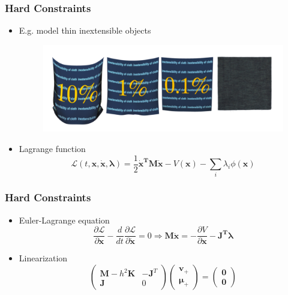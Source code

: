 \documentclass[serif,mathserif]{beamer}
\newcommand{\BOLD}[1]{\mathbf{#1}}
\newcommand{\PDIF}[2]{\frac{\partial #1}{\partial #2}}
\begin{document}
\begin{frame}
 \frametitle{Hard Constraints}
 \begin{itemize}
  \item E.g. model thin inextensible objects 
  \begin{figure}
    \centering 
    \includegraphics[scale=0.2]{img/inextensible.png}
  \end{figure}
  \item Lagrange function
    \begin{equation*}
      \mathcal{L}(t, \BOLD{x}, \BOLD{\dot x}, \BOLD{\lambda}) = \frac{1}{2}\BOLD{\dot x^T M \dot x} - V(\BOLD{x}) - \sum_i \lambda_i \phi(\BOLD{x})
    \end{equation*}
 \end{itemize}
\end{frame}

\begin{frame}
 \frametitle{Hard Constraints}
 \begin{itemize}
    \item Euler-Lagrange equation
    \begin{equation*}
      \PDIF{\mathcal{L}}{\BOLD{x}}-\frac{d}{dt}\PDIF{\mathcal{L}}{\BOLD{\dot x}} = 0
      \Longrightarrow \BOLD{M\ddot x} = -\PDIF{V}{\BOLD{x}}-\BOLD{J^T\lambda}
    \end{equation*}
    \pause
    \pause
    \item Linearization 
    \begin{equation*}
      \begin{pmatrix}
	\BOLD{M}-h^2\BOLD{K} & -\BOLD{J}^T \\
	\BOLD{J} & 0
      \end{pmatrix}
      \begin{pmatrix}
       \BOLD{v}_{+} \\ \BOLD{\mu}_{+}
      \end{pmatrix}
      =
      \begin{pmatrix}
       \BOLD{0} \\ \BOLD{0}
      \end{pmatrix}
    \end{equation*}
    \pause
 \end{itemize}
\end{frame}
\end{document}
